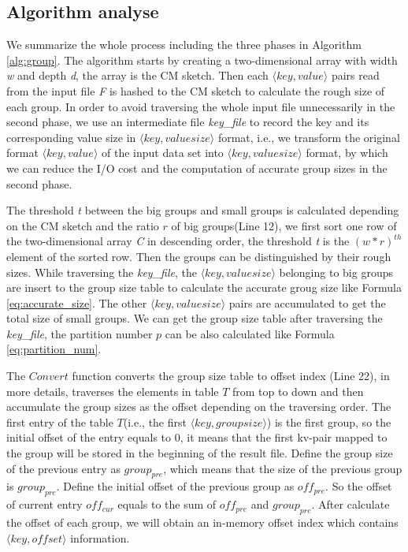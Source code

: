 \subsection{Algorithm analyse}
We summarize the whole process including the three phases in Algorithm \ref{alg:group}. The algorithm starts by creating a two-dimensional array with width \emph{w} and depth \emph{d}, the array is the CM sketch. Then each $\langle key, value\rangle$ pairs read from the input file \emph{F} is hashed to the CM sketch to calculate the rough size of each group. In order to avoid traversing the whole input file unnecessarily in the second phase, we use an intermediate file \emph{key\_file} to record the key and its corresponding value size in $\langle key, valuesize\rangle$ format, i.e., we transform the original format $\langle key, value\rangle$ of the input data set into $\langle key, valuesize\rangle$ format, by which we can reduce the I/O cost and the computation of accurate group sizes in the second phase.

The threshold \emph{t} between the big groups and small groups is calculated depending on the CM sketch and the ratio $r$ of big groups(Line 12), we first sort one row of the two-dimensional array \emph{C} in descending order, the threshold \emph{t} is the ${(w*r)}^{th}$ element of the sorted row. Then the groups can be distinguished by their rough sizes. While traversing the \emph{key\_file}, the $\langle key, valuesize\rangle$ belonging to big groups are insert to the group size table to calculate the accurate groug size like Formula \ref{eq:accurate_size}. The other $\langle key, valuesize\rangle$ pairs are accumulated to get the total size of small groups. We can get the group size table after traversing the \emph{key\_file}, the partition number $p$ can be also calculated like Formula \ref{eq:partition_num}.

The $Convert$ function converts the group size table to offset index (Line 22), in more details, traverses the elements in table $T$ from top to down and then accumulate the group sizes as the offset depending on the traversing order. The first entry of the table $T$(i.e., the first $\langle key, groupsize\rangle$) is the first group, so the initial offset of the entry equals to 0, it means that the first kv-pair mapped to the group will be stored in the beginning of the result file. Define the group size of the previous entry as $group_{pre}$, which means that the size of the previous group is $group_{pre}$. Define the initial offset of the previous group as ${off}_{pre}$. So the offset of current entry ${off}_{cur}$ equals to the sum of ${off}_{pre}$ and $group_{pre}$. After calculate the offset of each group, we will obtain an in-memory offset index which contains $\langle key,offset\rangle$ information. 

